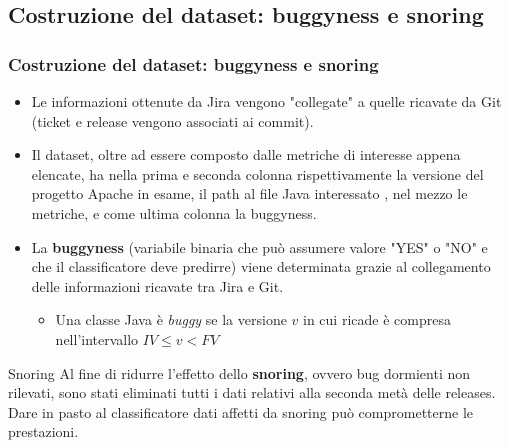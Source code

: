 \documentclass{beamer}
\begin{document}
\subsection{Costruzione del dataset: buggyness e snoring}
\begin{frame}
	\frametitle{Costruzione del dataset: buggyness e snoring}
	
	\begin{itemize}
		\item Le informazioni ottenute da Jira vengono "collegate" a quelle ricavate da Git (ticket e release vengono 
		associati ai commit).
		
		\item Il dataset, oltre ad essere composto dalle metriche di interesse appena elencate, 
		ha nella prima e seconda colonna rispettivamente
		la versione del progetto Apache in esame, il path al file Java interessato , nel mezzo le metriche,
		e come ultima colonna la buggyness.
		
		\item La \textbf{buggyness}
		(variabile binaria che può assumere valore "YES" o "NO" e che il classificatore deve predirre) viene 
		determinata grazie al collegamento delle informazioni ricavate tra Jira e Git.
		\begin{itemize}
			\item Una classe Java è \textit{buggy} se la versione $v$ in cui ricade è compresa nell'intervallo 
			$IV \le v < FV$
		\end{itemize}
	\end{itemize}
	
	\begin{alertblock}{Snoring}
	Al fine di ridurre l'effetto dello \textbf{snoring}, ovvero bug dormienti non rilevati, sono stati eliminati
	tutti i dati relativi alla seconda metà delle releases. Dare in pasto al classificatore dati affetti da
	snoring può comprometterne le prestazioni.
	\end{alertblock}
	
\end{frame}
\end{document}
